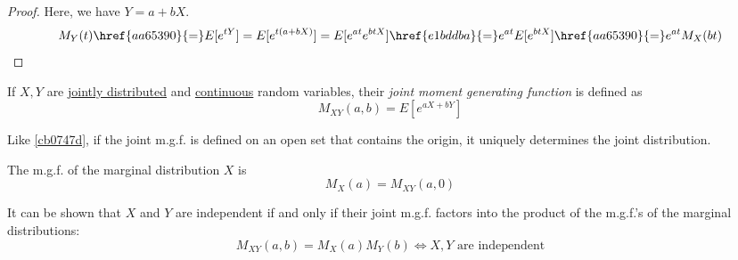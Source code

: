 \begin{proof}
   Here, we have $Y=a+bX$.
  $$
    M_Y(t)
    \href{aa65390}{=}E[e^{tY}]
    =E[e^{t(a+bX)}]
    =E[e^{at}e^{btX}]
    \href{e1bddba}{=}e^{at}E[e^{btX}]
    \href{aa65390}{=}e^{at}M_X(bt)
  $$
\end{proof}

\label{f75e21a}

If $X,Y$ are \href{ab5a852}{jointly distributed} and \href{bdb1e15}{continuous}
random variables, their \textit{joint moment generating function} is defined as
$$
  M_{XY}(a,b)=E[e^{aX+bY}]
$$

Like \autoref{cb0747d}, if the joint m.g.f. is defined on an open set that
contains the origin, it uniquely determines the joint distribution.

The m.g.f. of the marginal distribution $X$ is
$$
  M_X(a)=M_{XY}(a,0)
$$

It can be shown that $X$ and $Y$ are independent if and only if their joint
m.g.f. factors into the product of the m.g.f.'s of the marginal distributions:
$$
  M_{XY}(a,b)=M_X(a)M_Y(b)\iff\text{$X,Y$ are independent}
$$
